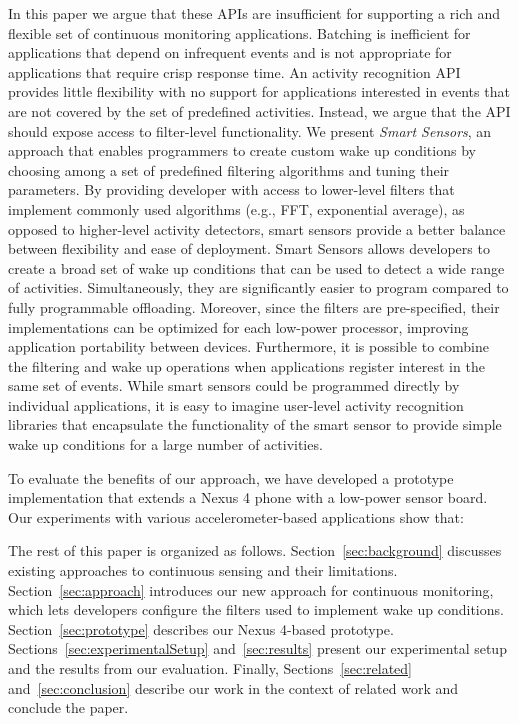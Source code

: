 In this paper we argue that these APIs are insufficient for supporting
a rich and flexible set of continuous monitoring applications.
Batching is inefficient for applications that depend on infrequent
events and is not appropriate for applications that require crisp
response time.  An activity recognition API provides little
flexibility with no support for applications interested in events that
are not covered by the set of predefined activities.  Instead, we
argue that the API should expose access to filter-level functionality.
We present {\em Smart Sensors}, an approach that enables programmers
to create custom wake up conditions by choosing among a set of
predefined filtering algorithms and tuning their parameters.  By
providing developer with access to lower-level filters that implement
commonly used algorithms (e.g., FFT, exponential average), as opposed
to higher-level activity detectors, smart sensors provide a better
balance between flexibility and ease of deployment.  Smart Sensors allows
developers to create a broad set of wake up conditions that can be used
to detect a wide range of activities.  Simultaneously, they are
significantly easier to program compared to fully programmable
offloading.  Moreover, since the filters are pre-specified, their
implementations can be optimized for each low-power processor,
improving application portability between devices.  Furthermore, it is
possible to combine the filtering and wake up operations when
applications register interest in the same set of events.  While smart
sensors could be programmed directly by individual applications, it is
easy to imagine user-level activity recognition libraries that
encapsulate the functionality of the smart sensor to provide simple
wake up conditions for a large number of activities.

To evaluate the benefits of our approach, we have developed a prototype
implementation that extends a Nexus 4 phone with a low-power sensor
board.  Our experiments with various accelerometer-based applications
show that: 

The rest of this paper is organized as follows.
Section~\ref{sec:background} discusses existing approaches to
continuous sensing and their limitations.  Section~\ref{sec:approach}
introduces our new approach for continuous monitoring, which lets
developers configure the filters used to implement wake up conditions.
Section~\ref{sec:prototype} describes our Nexus 4-based prototype.
Sections~\ref{sec:experimentalSetup} and~\ref{sec:results} present our
experimental setup and the results from our evaluation.  Finally,
Sections~\ref{sec:related} and~\ref{sec:conclusion} describe our work
in the context of related work and conclude the paper.

